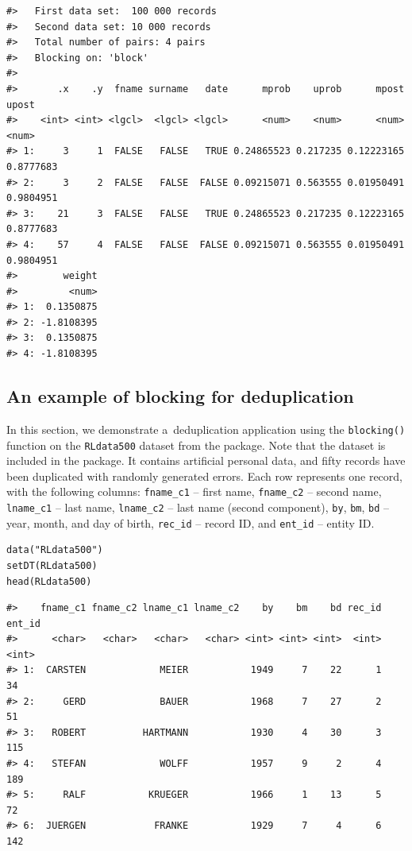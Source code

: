 \begin{verbatim}
#>   First data set:  100 000 records
#>   Second data set: 10 000 records
#>   Total number of pairs: 4 pairs
#>   Blocking on: 'block'
#> 
#>       .x    .y  fname surname   date      mprob    uprob      mpost     upost
#>    <int> <int> <lgcl>  <lgcl> <lgcl>      <num>    <num>      <num>     <num>
#> 1:     3     1  FALSE   FALSE   TRUE 0.24865523 0.217235 0.12223165 0.8777683
#> 2:     3     2  FALSE   FALSE  FALSE 0.09215071 0.563555 0.01950491 0.9804951
#> 3:    21     3  FALSE   FALSE   TRUE 0.24865523 0.217235 0.12223165 0.8777683
#> 4:    57     4  FALSE   FALSE  FALSE 0.09215071 0.563555 0.01950491 0.9804951
#>        weight
#>         <num>
#> 1:  0.1350875
#> 2: -1.8108395
#> 3:  0.1350875
#> 4: -1.8108395
\end{verbatim}

\subsection{An example of blocking for deduplication}\label{an-example-of-blocking-for-deduplication}

In this section, we demonstrate a~deduplication application using the
\texttt{blocking()} function on the \texttt{RLdata500} dataset from the
 package. Note that the dataset is included in
the  package. It contains artificial personal data,
and fifty records have been duplicated with randomly generated errors.
Each row represents one record, with the following columns: \texttt{fname\_c1}
-- first name, \texttt{fname\_c2} -- second name, \texttt{lname\_c1} -- last name,
\texttt{lname\_c2} -- last name (second component), \texttt{by}, \texttt{bm}, \texttt{bd} -- year,
month, and day of birth, \texttt{rec\_id} -- record ID, and \texttt{ent\_id} -- entity
ID.

\begin{verbatim}
data("RLdata500")
setDT(RLdata500)
head(RLdata500)
\end{verbatim}

\begin{verbatim}
#>    fname_c1 fname_c2 lname_c1 lname_c2    by    bm    bd rec_id ent_id
#>      <char>   <char>   <char>   <char> <int> <int> <int>  <int>  <int>
#> 1:  CARSTEN             MEIER           1949     7    22      1     34
#> 2:     GERD             BAUER           1968     7    27      2     51
#> 3:   ROBERT          HARTMANN           1930     4    30      3    115
#> 4:   STEFAN             WOLFF           1957     9     2      4    189
#> 5:     RALF           KRUEGER           1966     1    13      5     72
#> 6:  JUERGEN            FRANKE           1929     7     4      6    142
\end{verbatim}


